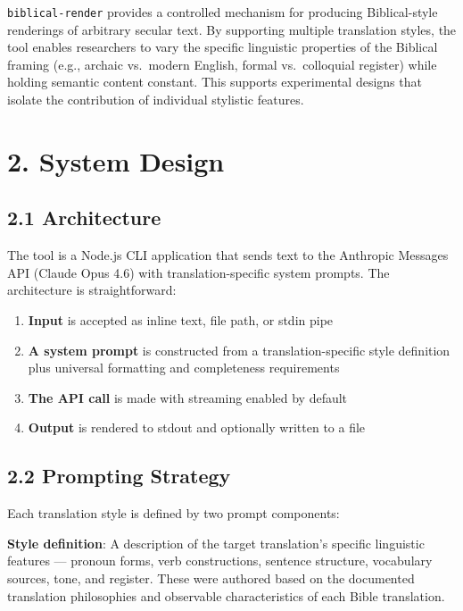 \documentclass[10pt, letterpaper, twocolumn]{article}
\providecommand{\tightlist}{\setlength{\itemsep}{0pt}\setlength{\parskip}{0pt}}
\begin{document}
\texttt{biblical-render} provides a controlled mechanism for producing Biblical-style renderings of arbitrary secular text. By supporting multiple translation styles, the tool enables researchers to vary the specific linguistic properties of the Biblical framing (e.g., archaic vs.~modern English, formal vs.~colloquial register) while holding semantic content constant. This supports experimental designs that isolate the contribution of individual stylistic features.

\section*{2. System Design}\label{system-design}

\subsection*{2.1 Architecture}\label{architecture}

The tool is a Node.js CLI application that sends text to the Anthropic Messages API (Claude Opus 4.6) with translation-specific system prompts. The architecture is straightforward:

\begin{enumerate}
\def\labelenumi{\arabic{enumi}.}
\tightlist
\item
  \textbf{Input} is accepted as inline text, file path, or stdin pipe
\item
  \textbf{A system prompt} is constructed from a translation-specific style definition plus universal formatting and completeness requirements
\item
  \textbf{The API call} is made with streaming enabled by default
\item
  \textbf{Output} is rendered to stdout and optionally written to a file
\end{enumerate}

\subsection*{2.2 Prompting Strategy}\label{prompting-strategy}

Each translation style is defined by two prompt components:

\textbf{Style definition}: A description of the target translation's specific linguistic features --- pronoun forms, verb constructions, sentence structure, vocabulary sources, tone, and register. These were authored based on the documented translation philosophies and observable characteristics of each Bible translation.
\end{document}
